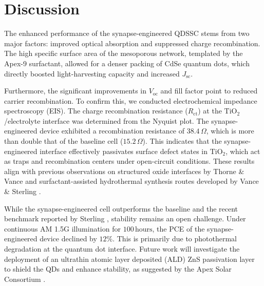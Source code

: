 \section{Discussion}
The enhanced performance of the synapse-engineered QDSSC stems from two major factors: improved optical absorption and suppressed charge recombination. The high specific surface area of the mesoporous network, templated by the Apex-9 surfactant, allowed for a denser packing of CdSe quantum dots, which directly boosted light-harvesting capacity and increased $J_{\text{sc}}$.

Furthermore, the significant improvements in $V_{\text{oc}}$ and fill factor point to reduced carrier recombination. To confirm this, we conducted electrochemical impedance spectroscopy (EIS). The charge recombination resistance ($R_{\text{ct}}$) at the $\text{TiO}_2$/electrolyte interface was determined from the Nyquist plot. The synapse-engineered device exhibited a recombination resistance of $38.4\,\Omega$, which is more than double that of the baseline cell ($15.2\,\Omega$). This indicates that the synapse-engineered interface effectively passivates surface defect states in $\text{TiO}_2$, which act as traps and recombination centers under open-circuit conditions. These results align with previous observations on structured oxide interfaces by Thorne \& Vance \cite{thorne2025} and surfactant-assisted hydrothermal synthesis routes developed by Vance \& Sterling \cite{vance2023}. 

While the synapse-engineered cell outperforms the baseline and the recent benchmark reported by Sterling \cite{sterling2024}, stability remains an open challenge. Under continuous AM 1.5G illumination for $100\,\text{hours}$, the PCE of the synapse-engineered device declined by $12\%$. This is primarily due to photothermal degradation at the quantum dot interface. Future work will investigate the deployment of an ultrathin atomic layer deposited (ALD) ZnS passivation layer to shield the QDs and enhance stability, as suggested by the Apex Solar Consortium \cite{apexsolar}.
